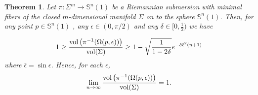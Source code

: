 \documentclass{amsart}
\newtheorem{theorem}{Theorem}[section]
\theoremstyle{definition}
\theoremstyle{remark}
\begin{document}
\begin{theorem}\label{TeoSub1}
Let  $\pi: \Sigma^m \to \mathbb{S}^n(1)$ be a Riemannian submersion with minimal fibers  of the closed $m$-dimensional manifold $\Sigma$ on to the sphere  $\mathbb{S}^n(1)$. Then, for any point $p \in \mathbb{S}^n(1)$ , any  $\epsilon \in (0,\pi/2)$ and any $\delta\in [0,\frac{1}{2})$ we have 

\begin{equation}
1\geq \frac{{\rm vol}\left(\pi^{-1}(\Omega(p,\epsilon))\right)}{{\rm vol}(\Sigma)}\geq  1- \sqrt{\frac{1}{1-2\delta}}e^{-\delta\bar\epsilon^2(n+1)}
\end{equation}
where $\bar\epsilon=\sin\epsilon$. Hence, for each  $\epsilon$,
\begin{equation}
\lim_{n\to\infty}\frac{{\rm vol}\left(\pi^{-1}(\Omega(p,\epsilon))\right)}{{\rm vol}(\Sigma)}=1.
\end{equation}
\end{theorem}
\end{document}
